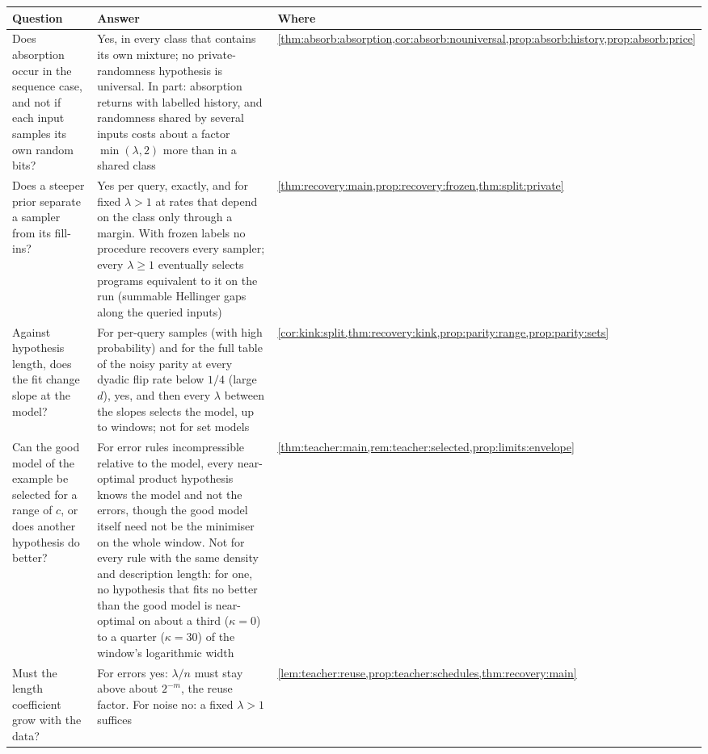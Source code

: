 \begin{table}[t]
\centering\footnotesize\crefabbrev\setlength{\tabcolsep}{4pt}
\begin{tabularx}{\linewidth}{@{}>{\raggedright\arraybackslash}p{4.1cm}>{\raggedright\arraybackslash}X>{\raggedright\arraybackslash}p{2.3cm}@{}}
\toprule
Question & Answer & Where\\
\midrule
Does absorption occur in the sequence case, and not if each input samples its own random bits? & Yes, in every class that contains its own mixture; no private-randomness hypothesis is universal. In part: absorption returns with labelled history, and randomness shared by several inputs costs about a factor $\min(\lambda,2)$ more than in a shared class & \cref{thm:absorb:absorption,cor:absorb:nouniversal,prop:absorb:history,prop:absorb:price}\\
Does a steeper prior separate a sampler from its fill-ins? & Yes per query, exactly, and for fixed $\lambda>1$ at rates that depend on the class only through a margin. With frozen labels no procedure recovers every sampler; every $\lambda\ge1$ eventually selects programs equivalent to it on the run (summable Hellinger gaps along the queried inputs) & \cref{thm:recovery:main,prop:recovery:frozen,thm:split:private}\\
Against hypothesis length, does the fit change slope at the model? & For per-query samples (with high probability) and for the full table of the noisy parity at every dyadic flip rate below $1/4$ (large $d$), yes, and then every $\lambda$ between the slopes selects the model, up to windows; not for set models & \cref{cor:kink:split,thm:recovery:kink,prop:parity:range,prop:parity:sets}\\
Can the good model of the example be selected for a range of $c$, or does another hypothesis do better? & For error rules incompressible relative to the model, every near-optimal product hypothesis knows the model and not the errors, though the good model itself need not be the minimiser on the whole window. Not for every rule with the same density and description length: for one, no hypothesis that fits no better than the good model is near-optimal on about a third ($\kappa=0$) to a quarter ($\kappa=30$) of the window's logarithmic width & \cref{thm:teacher:main,rem:teacher:selected,prop:limits:envelope}\\
Must the length coefficient grow with the data? & For errors yes: $\lambda/n$ must stay above about $2^{-m}$, the reuse factor. For noise no: a fixed $\lambda>1$ suffices & \cref{lem:teacher:reuse,prop:teacher:schedules,thm:recovery:main}\\

\end{tabularx}
\end{table}
